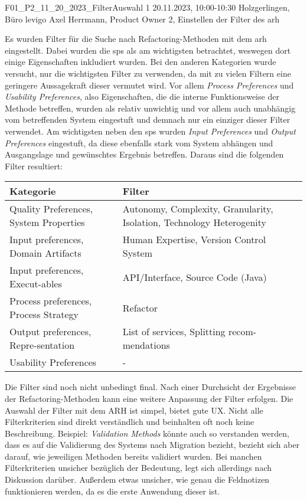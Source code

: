 \fieldnote
{F01\_P2\_11\_20\_2023\_FilterAuswahl}
{1}
{20.11.2023, 10:00-10:30}
{Holzgerlingen, Büro levigo}
{Axel Herrmann, Product Owner}
{2, Einstellen der Filter des \gls{arh}}
{
	Es wurden Filter für die Suche nach Refactoring-Methoden mit dem \gls{arh} eingestellt.
	Dabei wurden die \glspl{sp} als am wichtigsten betrachtet, weswegen dort einige Eigenschaften inkludiert wurden.
	Bei den anderen Kategorien wurde versucht, nur die wichtigsten Filter zu verwenden, da mit zu vielen Filtern eine geringere Aussagekraft dieser vermutet wird.
	Vor allem \emph{Process Preferences} und \emph{Usability Preferences}, also Eigenschaften, die die interne Funktionsweise der Methode betreffen, wurden als relativ unwichtig und vor allem auch unabhängig vom betreffenden System eingestuft und demnach nur ein einziger dieser Filter verwendet.
	Am wichtigsten neben den \glspl{sp} wurden \emph{Input Preferences} und \emph{Output Preferences} eingestuft, da diese ebenfalls stark vom System abhängen und Ausgangslage und gewünschtes Ergebnis betreffen.
	Daraus sind die folgenden Filter resultiert:
	\begin{tabular}{|p{4.5cm}|p{5.5cm}|}
		\hline
		\textbf{Kategorie} & \textbf{Filter} \\ \hline
		Quality Preferences, System Properties & Autonomy, Complexity, Granularity, Isolation, Technology Heterogenity \\ \hline
		Input preferences, Domain Artifacts & Human Expertise, Version Control System \\ \hline
		Input preferences, Execut-ables & API/Interface, Source Code (Java) \\ \hline
		Process preferences, Process Strategy & Refactor \\ \hline
		Output preferences, Repre-sentation & List of services, Splitting recom-mendations \\ \hline
		Usability Preferences & - \\ \hline
	\end{tabular}
}
{
	Die Filter sind noch nicht unbedingt final. Nach einer Durchsicht der Ergebnisse der Refactoring-Methoden kann eine weitere Anpassung der Filter erfolgen.
}
{
	Die Auswahl der Filter mit dem ARH ist simpel, bietet gute UX.
}
{
	Nicht alle Filterkriterien sind direkt verständlich und beinhalten oft noch keine Beschreibung. Beispiel: \emph{Validation Methods} könnte auch so verstanden werden, dass es auf die Validierung des Systems nach Migration bezieht, bezieht sich aber darauf, wie jeweiligen Methoden bereits validiert wurden.
}
{
	Bei manchen Filterkriterien unsicher bezüglich der Bedeutung, legt sich allerdings nach Diskussion darüber.
	Außerdem etwas unsicher, wie genau die Feldnotizen funktionieren werden, da es die erste Anwendung dieser ist.
}
